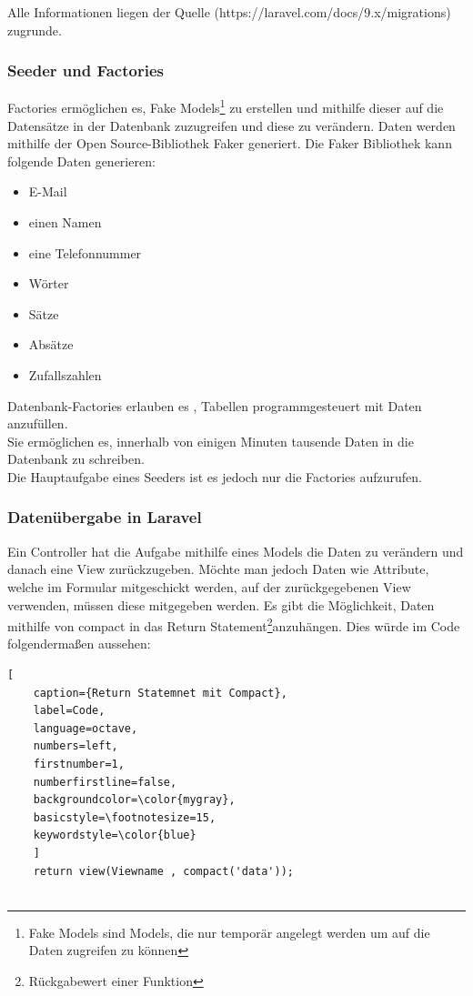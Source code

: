 Alle Informationen liegen der Quelle (https://laravel.com/docs/9.x/migrations) zugrunde.
\newpage
\subsubsection{Seeder und Factories}
Factories ermöglichen es, Fake Models\footnote{Fake Models sind Models, die nur temporär angelegt werden um auf die Daten zugreifen zu können} zu erstellen und mithilfe dieser auf die Datensätze in der Datenbank zuzugreifen und diese zu verändern. Daten werden mithilfe der Open Source-Bibliothek Faker generiert. Die Faker Bibliothek kann folgende Daten generieren: 



\begin{itemize}
	\item E-Mail 
	\item einen Namen
	\item eine Telefonnummer 
	\item Wörter
	\item Sätze 
	\item Absätze
	\item Zufallszahlen
\end{itemize}

Datenbank-Factories  erlauben es , Tabellen programmgesteuert mit Daten anzufüllen. \\Sie ermöglichen es, innerhalb von einigen Minuten tausende Daten in die Datenbank zu schreiben.\\
Die Hauptaufgabe eines Seeders ist es jedoch nur die Factories aufzurufen.

\subsubsection{Datenübergabe in Laravel}
Ein Controller hat die Aufgabe mithilfe eines Models die Daten zu verändern und danach eine View zurückzugeben. Möchte man jedoch Daten wie Attribute, welche im Formular mitgeschickt werden, auf der zurückgegebenen View verwenden, müssen diese mitgegeben werden.
Es gibt die Möglichkeit, Daten mithilfe von compact in das Return Statement\footnote{Rückgabewert einer Funktion}anzuhängen. Dies würde im Code folgendermaßen aussehen: 
\renewcommand{\lstlistingname}{Quellcode}

\begin{lstlisting}[
	caption={Return Statemnet mit Compact},
	label=Code,
	language=octave,
	numbers=left,
	firstnumber=1,
	numberfirstline=false,
	backgroundcolor=\color{mygray},
	basicstyle=\footnotesize=15,
	keywordstyle=\color{blue}
	]
	return view(Viewname , compact('data'));
	
\end{lstlisting}

